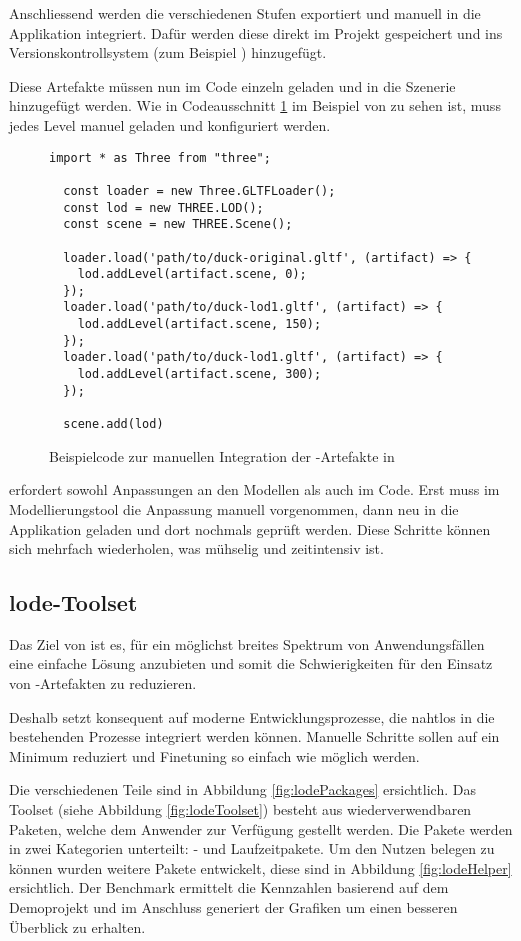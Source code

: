Anschliessend werden die verschiedenen Stufen exportiert und manuell in die Applikation integriert. Dafür werden diese direkt im Projekt gespeichert und ins Versionskontrollsystem (zum Beispiel ) hinzugefügt.

Diese Artefakte müssen nun im Code einzeln geladen und in die Szenerie hinzugefügt werden. Wie in Codeausschnitt \ref{code:threejsManualLodUsage} im Beispiel von  zu sehen ist, muss jedes Level manuel geladen und konfiguriert werden.
\begin{figure}[H]
  \begin{lstlisting}[style=JavaScript]
  import * as Three from "three";

  const loader = new Three.GLTFLoader();
  const lod = new THREE.LOD();
  const scene = new THREE.Scene();

  loader.load('path/to/duck-original.gltf', (artifact) => {
    lod.addLevel(artifact.scene, 0);
  });
  loader.load('path/to/duck-lod1.gltf', (artifact) => {
    lod.addLevel(artifact.scene, 150);
  });
  loader.load('path/to/duck-lod1.gltf', (artifact) => {
    lod.addLevel(artifact.scene, 300);
  });

  scene.add(lod)
  \end{lstlisting}
  \caption{Beispielcode zur manuellen Integration der -Artefakte in }
  \label{code:threejsManualLodUsage}
\end{figure}

 erfordert sowohl Anpassungen an den Modellen als auch im Code. Erst muss im Modellierungstool die Anpassung manuell vorgenommen, dann neu in die Applikation geladen und dort nochmals geprüft werden. Diese Schritte können sich mehrfach wiederholen, was mühselig und zeitintensiv ist.

\subsection{lode-Toolset}

Das Ziel von  ist es, für ein möglichst breites Spektrum von Anwendungsfällen eine einfache Lösung anzubieten und somit die Schwierigkeiten für den Einsatz von -Artefakten zu reduzieren.

Deshalb setzt  konsequent auf moderne Entwicklungsprozesse, die nahtlos in die bestehenden Prozesse integriert werden können. Manuelle Schritte sollen auf ein Minimum reduziert und Finetuning so einfach wie möglich werden.

Die verschiedenen Teile sind in Abbildung \ref{fig:lodePackages} ersichtlich. Das Toolset (siehe Abbildung \ref{fig:lodeToolset}) besteht aus wiederverwendbaren Paketen, welche dem Anwender zur Verfügung gestellt werden. Die Pakete werden in zwei Kategorien unterteilt: - und Laufzeitpakete. Um den Nutzen belegen zu können wurden weitere Pakete entwickelt, diese sind in Abbildung \ref{fig:lodeHelper} ersichtlich. Der Benchmark ermittelt die Kennzahlen basierend auf dem Demoprojekt und im Anschluss generiert der  Grafiken um einen besseren Überblick zu erhalten.

